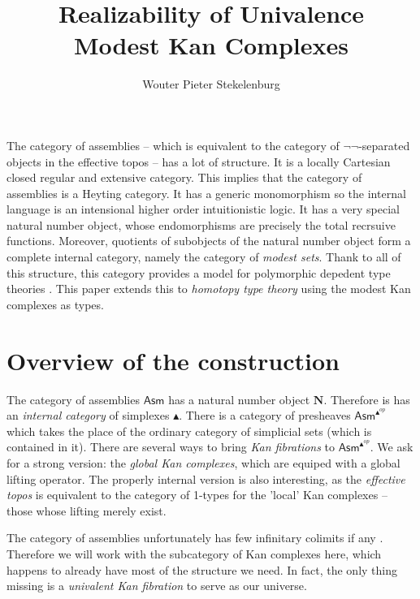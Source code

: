 \documentclass{amsart}
\title{Realizability of Univalence\\
Modest Kan Complexes}
\author[W. P. Stekelenburg]{Wouter Pieter Stekelenburg}
\theoremstyle{plain}
\theoremstyle{definition}
\newcommand\hide[1]{}
\newcommand\cat\mathcal
\begin{document}
\maketitle

The category of assemblies -- which is equivalent to the category of $\neg\neg$-separated objects in the effective topos -- has a lot of structure. It is a locally Cartesian closed regular and extensive category. This implies that the category of assemblies is a Heyting category. It has a generic monomorphism so the internal language is an intensional higher order intuitionistic logic. It has a very special natural number object, whose endomorphisms are precisely the total recrsuive functions. Moreover, quotients of subobjects of the natural number object form a complete internal category, namely the category of \emph{modest sets}. Thank to all of this structure, this category provides a model for polymorphic depedent type theories \hide{cite:Jacobs1999}. This paper extends this to \emph{homotopy type theory} using the modest Kan complexes as types.

\newcommand\asm{\mathsf{Asm}}
\newcommand\nno{\mathbf{N}}
\newcommand\Simpcat{\vartriangle}
\newcommand\simpcat{\blacktriangle}
\newcommand\dual{^{op}}
\newcommand\modset{\mathsf{Mod}}
\section{Overview of the construction}
The category of assemblies $\asm$ has a natural number object $\nno$. Therefore is has an \emph{internal category} of simplexes $\simpcat$. There is a category of presheaves $\asm^{\simpcat\dual}$ \hide{cite:M&M} which takes the place of the ordinary category of simplicial sets (which is contained in it). There are several ways to bring \emph{Kan fibrations} to $\asm^{\simpcat\dual}$. We ask for a strong version: the \emph{global Kan complexes}, which are equiped with a global lifting operator. The properly internal version is also interesting, as the \emph{effective topos} is equivalent to the category of 1-types for the 'local' Kan complexes -- those whose lifting merely exist.

The category of assemblies unfortunately has few infinitary colimits if any \hide{cite:Jaap}. Therefore we will work with the subcategory of Kan complexes here, which happens to already have most of the structure we need. In fact, the only thing missing is a \emph{univalent Kan fibration} to serve as our universe.

\hide{Nu kunnen we limieten en colimieten over het hele universum pakken om fibrant replacements te vinden. Deze categorie $\modset^{\simpcat\dual}$ is namelijk ook compleet.

Om van $\cat M$ een simplical set te maken hebben we een soort inductieve colimiet nodig, maar is de category van modest sets bestaan die gewoon. We kijken naar eindige bomen van morfismes binnen de categorie $\modset^{\simpcat\dual}$. Dit kan heel goed zelf weer een soort modest Kan complex zijn.

Hoe dan ook: we moeten werken met oneindige colimieten van modest sets, want daar buiten werkt vrijwel niets.
}
\end{document}
